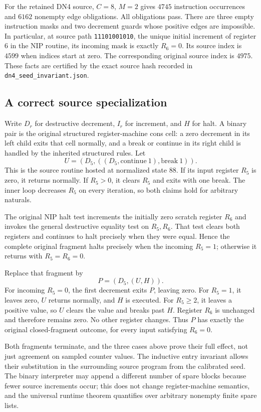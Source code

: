 For the retained DN4 source, $C=8$, $M=2$ gives $4745$ instruction
occurrences and $6162$ nonempty edge obligations.  All obligations pass.
There are three empty instruction masks and two decrement guards whose
positive edges are impossible.  In particular, at source path
\texttt{11101001010}, the unique initial increment of register $6$ in
the NIP routine, its incoming mask is exactly $R_6=0$.  Its source
index is $4599$ when indices start at zero.  The corresponding original
source index is $4975$.  These facts are certified by the exact source
hash recorded in \texttt{dn4\_seed\_invariant.json}.

\subsection{A correct source specialization}

Write $D_r$ for destructive decrement, $I_r$ for increment, and $H$ for
halt.  A binary pair is the original structured register-machine cons
cell: a zero decrement in its left child exits that cell normally,
and a break or continue in its right child is handled by the inherited
structured rules.  Let
\[
 U=(D_5,((D_5,\mathrm{continue}\ 1),\mathrm{break}\ 1)).
\]
This is the source routine hosted at normalized state $88$.  If its
input register $R_5$ is zero, it returns normally.  If $R_5>0$, it
clears $R_5$ and exits with one break.  The inner loop decreases $R_5$
on every iteration, so both claims hold for arbitrary naturals.

The original NIP halt test increments the initially zero scratch register
$R_6$ and invokes the general destructive equality test on $R_5,R_6$.
That test clears both registers and continues to halt precisely when they
were equal.  Hence the complete original fragment halts precisely when
the incoming $R_5=1$; otherwise it returns with $R_5=R_6=0$.

Replace that fragment by
\[
 P=(D_5,(U,H)).
\]
For incoming $R_5=0$, the first decrement exits $P$, leaving zero.
For $R_5=1$, it leaves zero, $U$ returns normally, and $H$ is executed.
For $R_5\geq2$, it leaves a positive value, so $U$ clears the value
and breaks past $H$.  Register $R_6$ is unchanged and therefore remains
zero.  No other register changes.  Thus $P$ has exactly the original
closed-fragment outcome, for every input satisfying $R_6=0$.

Both fragments terminate, and the three cases above prove their full
effect, not just agreement on sampled counter values.  The inductive
entry invariant allows their substitution in the surrounding source
program from the calibrated seed.  The binary interpreter may append a
different number of spare blocks because fewer source increments occur;
this does not change register-machine semantics, and the universal
runtime theorem quantifies over arbitrary nonempty finite spare lists.


